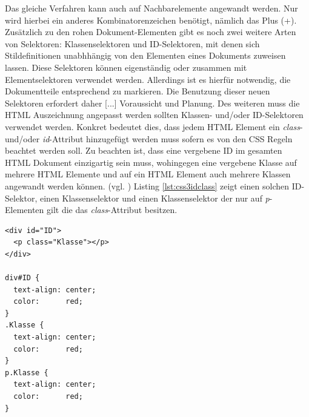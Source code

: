 \documentclass[12pt,a4paper,bibliography=totocnumbered,listof=totocnumbered]{scrartcl}
\begin{document}
Das gleiche Verfahren kann auch auf Nachbarelemente angewandt werden. Nur wird hierbei ein anderes Kombinatorenzeichen benötigt, nämlich das Plus (+).\\
\glqq Zusätzlich zu den rohen Dokument-Elementen gibt es noch zwei weitere Arten von Selektoren: Klassenselektoren und ID-Selektoren, mit denen sich Stildefinitionen unabhhängig von den Elementen eines Dokuments zuweisen lassen. Diese Selektoren können eigenständig oder zusammen mit Elementselektoren verwendet werden. Allerdings ist es hierfür notwendig, die Dokumentteile entsprechend zu markieren. Die Benutzung dieser neuen Selektoren erfordert daher [...] Voraussicht und Planung.\grqq{}\cite[S.34ff]{MeyeCasc2005} Des weiteren muss die HTML Auszeichnung angepasst werden sollten Klassen- und/oder ID-Selektoren verwendet werden. Konkret bedeutet dies, dass jedem HTML Element ein \textit{class}- und/oder \textit{id}-Attribut hinzugefügt werden muss sofern es von den CSS Regeln beachtet werden soll. Zu beachten ist, dass eine vergebene ID im gesamten HTML Dokument einzigartig sein muss, wohingegen eine vergebene Klasse auf mehrere HTML Elemente und auf ein HTML Element auch mehrere Klassen angewandt werden können. (vgl. \cite{W3ScCss2014}) Listing \ref{lst:css3idclass} zeigt einen solchen ID-Selektor, einen Klassenselektor und einen Klassenselektor der nur auf \textit{p}-Elementen gilt die das \textit{class}-Attribut besitzen.

	\vspace{1em}
	\begin{lstlisting}[caption=CSS3 Klassen- und ID-Selektoren, label=lst:css3idclass]
<div id="ID">
  <p class="Klasse"></p>
</div>

div#ID {
  text-align: center;
  color:      red;
}
.Klasse {
  text-align: center;
  color:      red;
}
p.Klasse {
  text-align: center;
  color:      red;
}
	\end{lstlisting}
	
\end{document}
